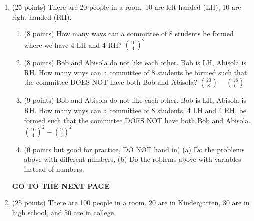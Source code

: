 \documentclass[12pt]{article}
\begin{document}
\begin{enumerate}
\begin{enumerate}
\item
(10 points) 
How many ways can Darling have lunch?
\textbf{180}
\item
(15 points) 
Darling says {\it My Bill, I don't  want to have both an apple for a fruit and applesauce or 
apple pie for desert.}
Now how many ways can Bill make her lunch?
\textbf{99}
\item 
(0 points but good for practice, DO NOT hand in.) 
(a) Do the two problem above with different numbers,
(b) Do the two problems above with variables instead of numbers
(e.g., $s$ sandwiches). 
\end{enumerate}

\vfill 

\centerline{\bf GO TO THE NEXT PAGE}

\newpage

\item 
(25 points) 
There are 20 people in a room. 10 are left-handed (LH), 10 are right-handed (RH). 

\begin{enumerate}
\item
(8 points) 
How many ways can a committee of 8 students be formed where
we have 4 LH and 4 RH?
\textbf{${10\choose 4}^2$}

\item 
(8 points) 
Bob and Abisola do not like each other.
Bob is LH, Abisola is RH. 
How many ways can a committee of 8 students be formed 
such that the committee DOES NOT have both Bob and Abisola? 
\textbf{${20 \choose 8} - {18 \choose 6}$}

\item 
(9 points) 
Bob and Abisola do not like each other.
Bob is LH, Abisola is RH. 
How many ways can a committee of 8 students, 4 LH and 4 RH,  be formed 
such that the committee DOES NOT have both  Bob and Abisola. 
\textbf{${10\choose 4}^2 - {9 \choose 3}^2$}

\item
(0 points but good for practice, DO NOT hand in)
(a) Do the problems above with different numbers,
(b) Do the roblems above with variables instead of numbers.
\end{enumerate}

\vfill 

\centerline{\bf GO TO THE NEXT PAGE}

\newpage

\item 
(25 points) 
There are 100 people in a room. 20 are in Kindergarten, 30 are in high school,
and 50 are in college. 


\end{enumerate}
\end{document}
